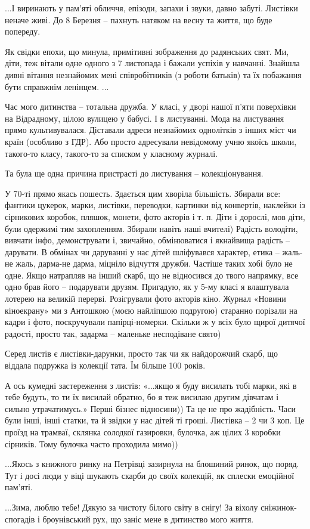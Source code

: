 ...І виринають у пам’яті обличчя, епізоди, запахи і звуки, давно забуті. Листівки
неначе живі. До 8 Березня – пахнуть натяком на весну та життя, що буде
попереду.

Як свідки епохи, що минула, примітивні зображення до радянських свят. Ми,
діти, теж вітали одне одного з 7 листопада і бажали успіхів у навчанні.
Знайшла дивні вітання незнайомих мені співробітників (з роботи батьків) та їх
побажання бути справжнім ленінцем. ...

Час мого дитинства – тотальна дружба. У класі, у дворі нашої п’яти поверхівки
на Відрадному, цілою вулицею у бабусі. І в листуванні. Мода на листування прямо
культивувалася. Діставали адреси незнайомих однолітків з інших міст чи країн
(особливо з ГДР). Або просто адресували невідомому учню якоїсь школи, такого-то
класу, такого-то за списком у класному журналі.

Та була ще одна причина пристрасті до листування – колекціонування.

У 70-ті прямо якась пошесть. Здається цим хворіла більшість. Збирали все:
фантики цукерок, марки, листівки, переводки, картинки від конвертів, наклейки
із сірникових коробок, пляшок, монети, фото акторів і т. п. Діти і дорослі, мов
діти, були одержимі тим захопленням. Збирали навіть наші вчителі) Радість
володіти, вивчати інфо, демонструвати і, звичайно, обмінюватися і якнайвища
радість – дарувати. В обмінах чи даруванні у нас дітей шліфувався характер,
етика – жаль-не жаль, дарма-не дарма, міцніло відчуття дружби. Частіше таких
хобі було не одне. Якщо натрапляв на інший скарб, що не відносився до твого
напрямку, все одно брав його – подарувати друзям. Пригадую, як у 5-му класі я
влаштувала лотерею на великій перерві. Розігрували фото акторів кіно. Журнал
«Новини кіноекрану» ми з Антошкою (моєю найліпшою подругою) старанно порізали
на кадри і фото, поскручували папірці-номерки. Скільки ж у всіх було щирої
дитячої радості, просто так, задарма – маленьке несподіване свято)

Серед листів є листівки-дарунки, просто так чи як найдорожчий скарб, що віддала
подружка із колекції тата. Їм більше 100 років.

А ось кумедні застереження з листів: «...якщо я буду висилать тобі марки, які в
тебе будуть, то ти їх висилай обратно, бо я теж висилаю другим дівчатам і
сильно утрачатимусь.» Перші бізнес відносини)) Та це не про жадібність. Часи
були інші, інші статки, та й звідки у нас дітей ті гроші. Листівка – 2 чи 3
коп. Це проїзд на трамваї, склянка солодкої газировки, булочка, аж цілих 3
коробки сірників. Тому булочка часто проходила мимо))

...Якось з книжного ринку на Петрівці зазирнула на блошиний ринок, що поряд. Тут
і досі люди у віці шукають скарби до своїх колекцій, як сплески емоційної
пам’яті.

...Зима, люблю тебе! Дякую за чистоту білого світу в снігу! За віхолу
сніжинок-спогадів і броунівський рух, що заніс мене в дитинство мого життя.
